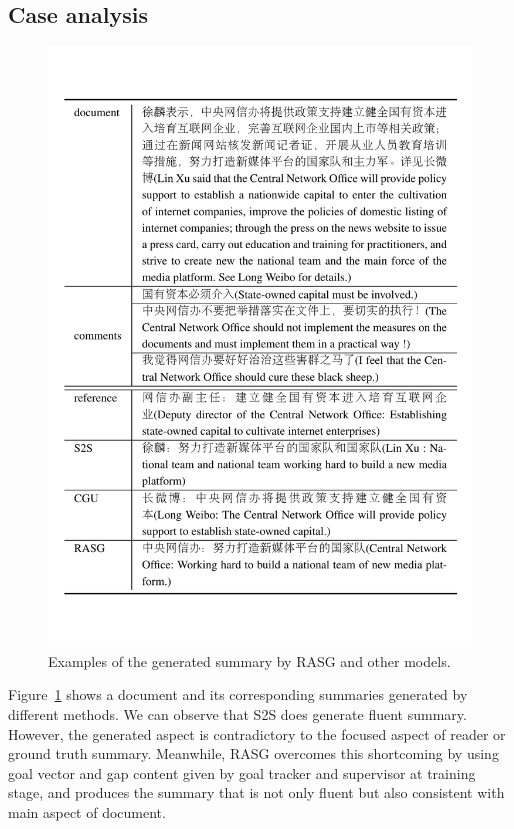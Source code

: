 \documentclass[letterpaper]{article} %
\begin{document}
\subsection{Case analysis}

\begin{figure}[!t]
    \centering
    \includegraphics[width=\linewidth]{figs/case.pdf}
    \caption{Examples of the generated summary by RASG and other models.}
    \label{tab:case}
\end{figure}

Figure~\ref{tab:case} shows a document and its corresponding summaries generated by different methods.
We can observe that S2S does generate fluent summary.
However, the generated aspect is contradictory to the focused aspect of reader or ground truth summary.
Meanwhile, RASG overcomes this shortcoming by using goal vector and gap content given by goal tracker and supervisor at training stage, and produces the summary that is not only fluent but also consistent with main aspect of document.
\end{document}
